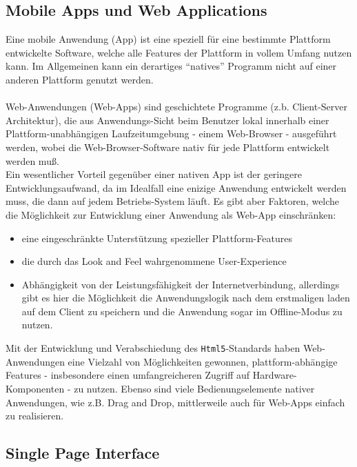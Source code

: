 \subsection{Mobile Apps und Web Applications}\label{4_MAWA}
Eine mobile Anwendung (App) ist eine speziell für eine bestimmte Plattform entwickelte Software, welche
alle Features der Plattform in vollem Umfang nutzen kann. Im Allgemeinen kann ein derartiges "`natives"' Programm nicht auf einer anderen Plattform genutzt werden.\\ \\
Web-Anwendungen (Web-Apps) sind geschichtete Programme (z.b. Client-Server Architektur), die aus Anwendungs-Sicht beim Benutzer lokal innerhalb einer Plattform-unabhängigen Laufzeitumgebung - einem Web-Browser - ausgeführt werden, wobei die Web-Browser-Software nativ für jede Plattform entwickelt werden muß.\\
Ein wesentlicher Vorteil gegenüber einer nativen App ist der geringere Entwicklungsaufwand, da im Idealfall eine enizige Anwendung entwickelt werden muss, die dann auf jedem Betriebs-System läuft. Es gibt aber Faktoren, welche die Möglichkeit zur Entwicklung einer Anwendung als Web-App einschränken:
\begin{itemize}[leftmargin=*,noitemsep,topsep=1ex,parsep=0pt,partopsep=0pt]
\item eine eingeschränkte Unterstützung spezieller Plattform-Features
\item die durch das Look and Feel wahrgenommene User-Experience
\item Abhängigkeit von der Leistungsfähigkeit der Internetverbindung, allerdings gibt es hier die Möglichkeit die Anwendungslogik nach dem erstmaligen laden auf dem Client zu speichern und die Anwendung sogar im Offline-Modus zu nutzen.
\end{itemize}
Mit der Entwicklung und Verabschiedung des \texttt{Html5}-Standards haben Web-Anwendungen eine Vielzahl von Möglichkeiten gewonnen, plattform-abhängige Features - insbesondere einen umfangreicheren Zugriff auf Hardware-Komponenten - zu nutzen. Ebenso sind viele Bedienungselemente nativer Anwendungen, wie z.B. Drag and Drop, mittlerweile auch für Web-Apps einfach zu realisieren.

\subsection{Single Page Interface}\label{5_SPI}

